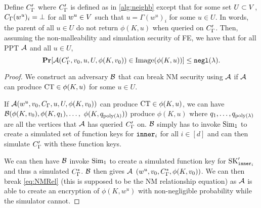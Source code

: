 \begin{lemma}
		\label{lem:NMIndepA}
		Define $C_\Gamma'$ where $C_\Gamma'$ is defined as in \cref{alg:neighb} except that
		for some set $U \subset V$, $C_\Gamma(w^u)_i = \bot$ for all $w^u \in V$ such that $u = \Gamma(w^u)_i$ for some $u \in U$.
		In words, the parent of all $u \in U$ do not return $\phi(K, u)$ when queried on $C_\Gamma'$.
		Then, assuming the non-malleability and simulation security of FE, we have that for all PPT $\mathcal{A}$
		and all $u \in U$,
		\begin{equation}
			\operatorname*{\mathbf{Pr}}[\mathcal{A}(C_\Gamma', v_0, u, U, \phi(K, v_0)) \in \text{Image}(\phi(K, u))] \leq \texttt{negl}(\lambda).
		\end{equation}
		\begin{proof}
			We construct an adversary $\mathcal{B}$ that can break NM security using $\mathcal{A}$ if $\mathcal{A}$ can
			produce $\text{CT} \in \phi(K, u)$ for some $u \in U$.
			
			If $\mathcal{A}(w^u, v_0, C_\Gamma, u, U, \phi(K, v_0))$ can produce $\text{CT} \in \phi(K, u)$,
			we can have $\mathcal{B}(\phi(K, v_0), \phi(K, q_1), \dots,$ $ \phi(K,q_{\operatorname{poly}(\lambda)}))$ 
			produce $\phi(K, u)$ where $q_1, \dots, q_{\operatorname{poly}(\lambda)}$ are all the vertices that $\mathcal{A}$ has queried $C_\Gamma'$ on.
			$\mathcal{B}$ simply has to invoke $\text{Sim}_1$ to create a simulated set of function keys for $\texttt{inner}_i$ for all $i \in [d]$
			and can then simulate $C_\Gamma'$ with these function keys.

			We can then have $\mathcal{B}$ invoke $\text{Sim}_1$ to create a simulated function key for $\text{SK}_{\texttt{inner}_i}'$
			and thus a simulated $C_\Gamma^{*}$.
			$\mathcal{B}$ then gives $\mathcal{A}$ $(w^u, v_0, C_\Gamma^{*}, \phi(K, v_0))$.
			We can then break \cref{eq:NMRel} (this is supposed to be the NM relationship equation) as $\mathcal{A}$ is able to create an encryption of $\phi(K, w^u)$ with non-negligible probability while the simulator cannot.
		\end{proof}
\end{lemma}
